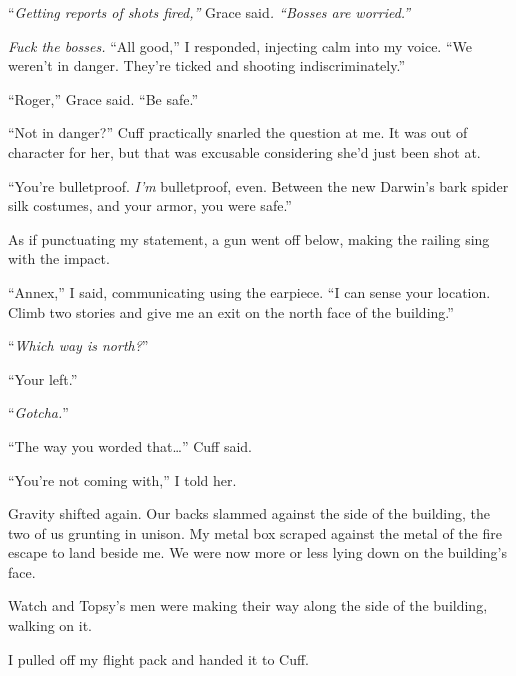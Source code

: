 ``\emph{Getting reports of shots fired,'' }Grace said\emph{.  ``Bosses are worried.''}



\emph{Fuck the bosses.  }``All good,'' I responded, injecting calm into my voice.  ``We weren't in danger.  They're ticked and shooting indiscriminately.''



``Roger,'' Grace said.  ``Be safe.''



``Not in danger?'' Cuff practically snarled the question at me.  It was out of character for her, but that was excusable considering she'd just been shot at.



``You're bulletproof.  \emph{I'm} bulletproof, even.  Between the new Darwin's bark spider silk costumes, and your armor, you were safe.''



As if punctuating my statement, a gun went off below, making the railing sing with the impact.



``Annex,'' I said, communicating using the earpiece.  ``I can sense your location.  Climb two stories and give me an exit on the north face of the building.''



``\emph{Which way is north?}''



``Your left.''



``\emph{Gotcha.}''



``The way you worded that\ldots'' Cuff said.



``You're not coming with,'' I told her.



Gravity shifted again.  Our backs slammed against the side of the building, the two of us grunting in unison.  My metal box scraped against the metal of the fire escape to land beside me.  We were now more or less lying down on the building's face.



Watch and Topsy's men were making their way along the side of the building, walking on it.



I pulled off my flight pack and handed it to Cuff.



